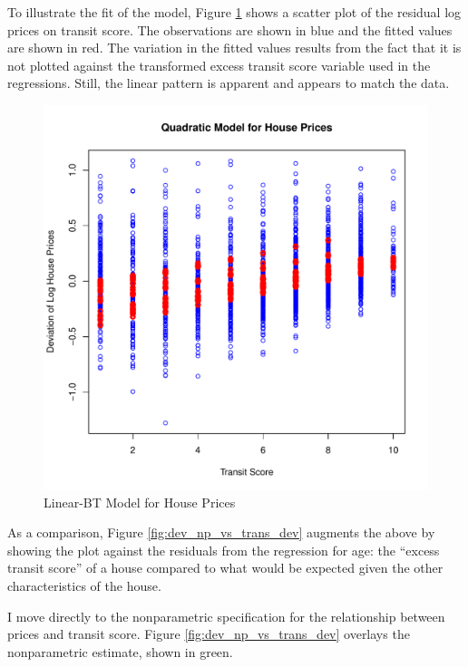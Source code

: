 \pagebreak 
To illustrate the fit of the model, 
Figure \ref{fig:dev_vs_trans} shows a scatter plot 
of the residual log prices on transit score. 
The observations are shown in blue
and the fitted values are shown in red.
The variation in the fitted values results from the 
fact that it is not plotted against the transformed excess transit score variable used in the regressions.
Still, the linear pattern is apparent
and appears to match the data. 

\begin{figure}[h!]
  \centering
  \includegraphics[scale = 0.5, keepaspectratio=true]{../Figures/dev_vs_trans}
  \caption{Linear-BT Model for House Prices} \label{fig:dev_vs_trans}
\end{figure}



\pagebreak
As a comparison, Figure \ref{fig:dev_np_vs_trans_dev} 
augments the above by showing the plot against the 
residuals from the regression for age:
the ``excess transit score'' of a house compared to what would be 
expected given the other characteristics of the house. 

% 
I move directly to the nonparametric specification for 
the relationship between prices and transit score.
Figure \ref{fig:dev_np_vs_trans_dev} 
overlays the nonparametric estimate, shown in green. 



